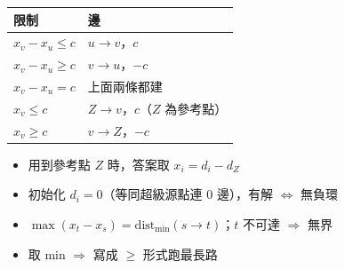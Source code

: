 \begin{tabular}{|l|l|}
    \hline
    限制 & 邊 \\
    \hline
    $x_v - x_u \le c$ & $u \to v$，$c$ \\
    $x_v - x_u \ge c$ & $v \to u$，$-c$ \\
    $x_v - x_u = c$ & 上面兩條都建 \\
    $x_v \le c$ & $Z \to v$，$c$（$Z$ 為參考點） \\
    $x_v \ge c$ & $v \to Z$，$-c$ \\
    \hline
\end{tabular}
\begin{itemize}
    \item 用到參考點 $Z$ 時，答案取 $x_i = d_i - d_Z$
    \item 初始化 $d_i = 0$（等同超級源點連 0 邊），有解 $\iff$ 無負環
    \item $\max(x_t - x_s) = \mathrm{dist}_{\min}(s \to t)$；$t$ 不可達 $\Rightarrow$ 無界
    \item 取 min $\Rightarrow$ 寫成 $\ge$ 形式跑最長路
\end{itemize}
